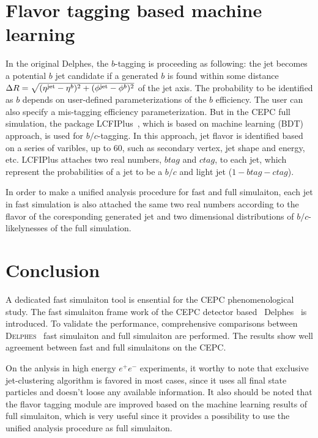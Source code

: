 \documentclass[a4paper,10pt,twoside]{cpc-hepnp}
\begin{document}
\begin{multicols}{2}
\section{Flavor tagging based machine learning\label{b-tagging}}
In the original {\textsf{Delphes}}, the $b$-tagging is proceeding as following:
the jet becomes a potential $b$ jet candidate if a generated $b$ is found within
some distance $\Delta R = \sqrt{(\eta^{\mbox{\scriptsize jet}}-\eta^b)^2+(\phi^{\mbox{\scriptsize jet}}-\phi^b)^2}$ of the jet axis.
The probability to be identified as $b$ depends on user-defined parameterizations of the $b$ efficiency.
The user can also specify a mis-tagging efficiency parameterization.
But in the CEPC full simulation, the package LCFIPlus~\cite{ref:lcfiplus},
which is based on machine learning (BDT) approach, is used for $b/c$-tagging.
In this approach, jet flavor is identified based on a series of varibles, up to 60, such as secondary vertex, jet shape and energy, etc.
LCFIPlus attaches two real numbers, $btag$ and $ctag$, to each jet,
which represent the probabilities of a jet to be a $b/c$ and light jet ($1-btag-ctag$).

In order to make a unified analysis procedure for fast and full simulaiton,
each jet in fast simulation is also attached the same two real numbers according to the flavor of the coresponding generated jet
and two dimensional distributions of $b/c$-likelynesses of the full simulation.

\section{Conclusion\label{sec:conclusion}}
A dedicated fast simulaiton tool is ensential for the CEPC phenomenological study.
The fast simulaiton  frame work of the CEPC detector based {~\textsf{Delphes}~} is introduced. 
To validate the performance, comprehensive comparisons between {\textsc{Delphes}~} fast simulaiton and full simulaiton are performed.
The results show  well agreement between fast and full simulaitons on the CEPC.

On the anlysis in high energy $e^+e^-$ experiments, it worthy to note that exclusive jet-clustering algorithm is favored in most cases,
since it uses all final state particles and doesn't loose any available information. 
It also should be noted that the flavor tagging module are improved based on the machine learning results of full simulaiton, 
which is very useful since it provides a possibility to use the unified analysis procedure as full simulaiton.
\vspace{3mm}


\end{multicols}
\end{document}
